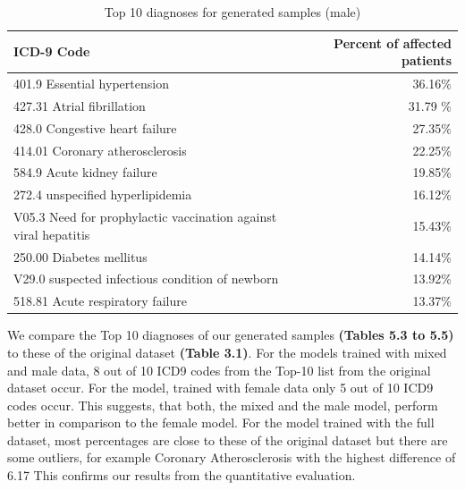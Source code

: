 \documentclass[11pt, a4paper, oneside]{book}
\begin{document}
\begin{table}
\begin{tabular}{l|r}
\textbf{ICD-9 Code} & \textbf{Percent of affected patients}\\
\hline
401.9  Essential hypertension & 36.16\%\\
427.31 Atrial fibrillation & 31.79 \%\\
428.0 Congestive heart failure & 27.35\%\\
414.01 Coronary atherosclerosis & 22.25\%\\
584.9 Acute kidney failure & 19.85\%\\
272.4 unspecified hyperlipidemia & 16.12\%\\
V05.3 Need for prophylactic vaccination against viral hepatitis & 15.43\%\\
250.00 Diabetes mellitus & 14.14\%\\
V29.0 suspected infectious condition of newborn & 13.92\%\\
518.81  Acute respiratory failure & 13.37\%\\
\end{tabular}
\caption{\label{tab:top10-icd-mixed}Top 10 diagnoses for generated samples (male)}
\end{table}

We compare the Top 10 diagnoses of our generated samples \textbf{(Tables 5.3 to 5.5)} to these of the original dataset \textbf{(Table 3.1)}. For the models trained with mixed and male data, 8 out of 10 ICD9 codes from the Top-10 list from the original dataset occur. For the model, trained with female data only 5 out of 10 ICD9 codes occur. This suggests, that both, the mixed and the male model, perform better in comparison to the female model.
 For the model trained with the full dataset, most percentages are close to these of the original dataset but there are some outliers, for example 
Coronary Atherosclerosis with the highest difference of 6.17%
This confirms our results from the quantitative evaluation.
\end{document}
